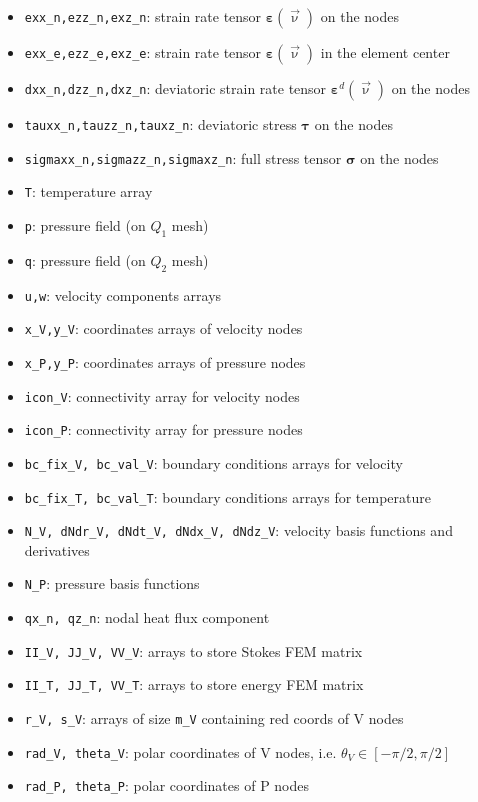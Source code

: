 \documentclass[a4paper,12pt]{article}
\begin{document}
\begin{itemize}
\item \lstinline{exx_n,ezz_n,exz_n}: strain rate tensor ${\bm \varepsilon}(\vec\upnu)$ on the nodes
\item \lstinline{exx_e,ezz_e,exz_e}: strain rate tensor ${\bm \varepsilon}(\vec\upnu)$ in the element center
\item \lstinline{dxx_n,dzz_n,dxz_n}: deviatoric strain rate tensor ${\bm \varepsilon}^d(\vec\upnu)$ on the nodes
\item \lstinline{tauxx_n,tauzz_n,tauxz_n}: deviatoric stress ${\bm \tau}$ on the nodes
\item \lstinline{sigmaxx_n,sigmazz_n,sigmaxz_n}: full stress tensor ${\bm \sigma}$ on the nodes
\item \lstinline{T}: temperature array
\item \lstinline{p}: pressure field (on $Q_1$ mesh)
\item \lstinline{q}: pressure field (on $Q_2$ mesh)
\item \lstinline{u,w}:  velocity components arrays
\item \lstinline{x_V,y_V}: coordinates arrays of velocity nodes
\item \lstinline{x_P,y_P}: coordinates arrays of pressure nodes
\item \lstinline{icon_V}: connectivity array for velocity nodes
\item \lstinline{icon_P}: connectivity array for pressure nodes
\item \lstinline{bc_fix_V, bc_val_V}: boundary conditions arrays for velocity
\item \lstinline{bc_fix_T, bc_val_T}: boundary conditions arrays for temperature
\item \lstinline{N_V, dNdr_V, dNdt_V, dNdx_V, dNdz_V}: velocity basis functions and derivatives
\item \lstinline{N_P}: pressure basis functions
\item \lstinline{qx_n, qz_n}: nodal heat flux component
\item \lstinline{II_V, JJ_V, VV_V}: arrays to store Stokes FEM matrix
\item \lstinline{II_T, JJ_T, VV_T}: arrays to store energy FEM matrix
\item \lstinline{r_V, s_V}: arrays of size \lstinline{m_V} containing red coords of V nodes
\item \lstinline{rad_V, theta_V}: polar coordinates of V nodes, i.e. $\theta_V\in[-\pi/2,\pi/2]$
\item \lstinline{rad_P, theta_P}: polar coordinates of P nodes
\end{itemize}
\end{document}
